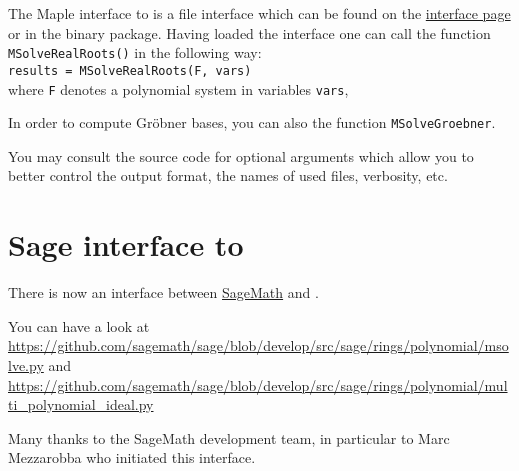 \documentclass[a4paper,english,11pt]{scrartcl}
\theoremstyle{definition}
\theoremstyle{remark}
\begin{document}
The Maple interface to \msolve is a file interface which can be found on the
\msolve \href{https://msolve.lip6.fr/interfaces/index.html}{interface
  page} or in the \msolve binary package. Having loaded the interface
one can call the function
\texttt{MSolveRealRoots()} in the following way:\\[1em]
\texttt{results = MSolveRealRoots(F, vars)}\\[1em]
where \texttt{F} denotes a polynomial system in variables \texttt{vars},


In order to compute Gr\"obner bases, you can also the function
\texttt{MSolveGroebner}. 

You may consult the source code for optional arguments which allow you to better
control the output format, the names of used files, verbosity, etc.

\section{Sage interface to \msolve}

There is now an interface between \href{https://www.sagemath.org/}{SageMath} 
and \msolve. 

You can have a look at 
\url{https://github.com/sagemath/sage/blob/develop/src/sage/rings/polynomial/msolve.py}
and 
\url{https://github.com/sagemath/sage/blob/develop/src/sage/rings/polynomial/multi_polynomial_ideal.py}

\hfill Many thanks to the SageMath development team, in particular to Marc 
Mezzarobba who initiated this interface.

\end{document}
